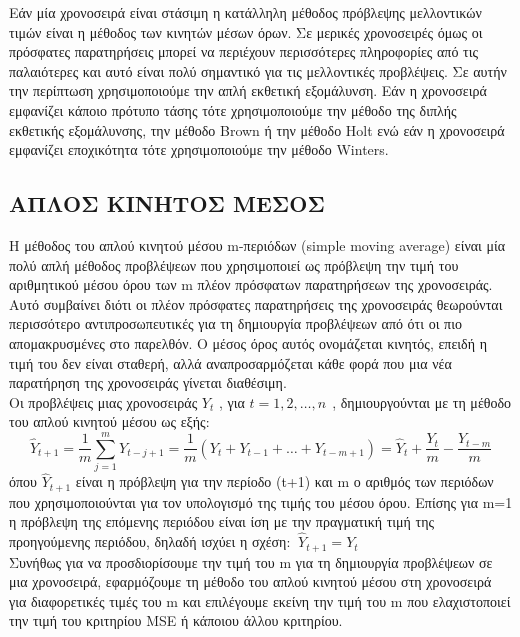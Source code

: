 Εάν μία χρονοσειρά είναι στάσιμη η κατάλληλη μέθοδος πρόβλεψης μελλοντικών
τιμών είναι η μέθοδος των κινητών μέσων όρων. Σε μερικές χρονοσειρές όμως οι
πρόσφατες παρατηρήσεις μπορεί να περιέχουν περισσότερες πληροφορίες από τις
παλαιότερες και αυτό είναι πολύ σημαντικό για τις μελλοντικές προβλέψεις. Σε αυτήν
την περίπτωση χρησιμοποιούμε την απλή εκθετική εξομάλυνση. Εάν η χρονοσειρά
εμφανίζει κάποιο πρότυπο τάσης τότε χρησιμοποιούμε την μέθοδο της διπλής
εκθετικής εξομάλυνσης, την μέθοδο Brown ή την μέθοδο Holt ενώ εάν η χρονοσειρά
εμφανίζει εποχικότητα τότε χρησιμοποιούμε την μέθοδο Winters.

\subsection{ΑΠΛΟΣ ΚΙΝΗΤΟΣ ΜΕΣΟΣ}
Η μέθοδος του απλού κινητού μέσου m-περιόδων (simple moving average) είναι
μία πολύ απλή μέθοδος προβλέψεων που χρησιμοποιεί ως πρόβλεψη την τιμή του
αριθμητικού μέσου όρου των m πλέον πρόσφατων παρατηρήσεων της χρονοσειράς.
Αυτό συμβαίνει διότι οι πλέον πρόσφατες παρατηρήσεις της χρονοσειράς θεωρούνται
περισσότερο αντιπροσωπευτικές για τη δημιουργία προβλέψεων από ότι οι πιο
απομακρυσμένες στο παρελθόν. Ο μέσος όρος αυτός ονομάζεται κινητός, επειδή η
τιμή του δεν είναι σταθερή, αλλά αναπροσαρμόζεται κάθε φορά που μια νέα
παρατήρηση της χρονοσειράς γίνεται διαθέσιμη.\\
Οι προβλέψεις μιας χρονοσειράς $Y_t$ , για $t=1,2,\ldots,n \:\:$, δημιουργούνται με τη μέθοδο
του απλού κινητού μέσου ως εξής:\\
$$ \widehat{Y}_{t+1}=\frac{1}{m}\sum_{j=1}^m Y_{t-j+1}=\frac{1}{m} \left(Y_t +Y_{t-1}+\ldots+Y_{t-m+1}\right)=\widehat{Y}_t +\frac{Y_t}{m}-\frac{Y_{t-m}}{m} $$
όπου $\widehat{Y}_{t+1} $ είναι η πρόβλεψη για την περίοδο (t+1) και m ο αριθμός των περιόδων που
χρησιμοποιούνται για τον υπολογισμό της τιμής του μέσου όρου. Επίσης για m=1 η
πρόβλεψη της επόμενης περιόδου είναι ίση με την πραγματική τιμή της
προηγούμενης περιόδου, δηλαδή ισχύει η σχέση:
$\: \widehat{Y}_{t+1}=Y_t $ \\

Συνήθως για να προσδιορίσουμε την τιμή του m για τη δημιουργία προβλέψεων
σε μια χρονοσειρά, εφαρμόζουμε τη μέθοδο του απλού κινητού μέσου στη
χρονοσειρά για διαφορετικές τιμές του m και επιλέγουμε εκείνη την τιμή του m που
ελαχιστοποιεί την τιμή του κριτηρίου MSE ή κάποιου άλλου κριτηρίου.
